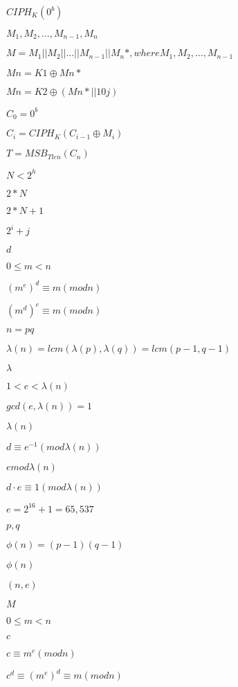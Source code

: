 \documentclass{article}
\begin{document}
${CIPH}_{K}({0}^{b})$
\pagebreak

${M}_{1}, {M}_{2}, ... , {M}_{n-1}, {M}_{n}$
\pagebreak

$M = {M}_{1} || {M}_{2} || ... || {M}_{n-1} || {M}_{n}*, where {M}_{1}, {M}_{2},...,{M}_{n-1}$
\pagebreak

$Mn = K1 \oplus Mn*$
\pagebreak

$Mn = K2 \oplus (Mn*||10j)$
\pagebreak

${C}_{0} = {0}^{b}$
\pagebreak

${C}_{i} = {CIPH}_{K}({C}_{i-1}\oplus{M}_{i})$
\pagebreak

$T = {MSB}_{Tlen}({C}_{n})$
\pagebreak

$ N < {2}^{h} $
\pagebreak

$ 2*N $
\pagebreak

$ 2*N + 1 $
\pagebreak

$ {2}^{i} + j $
\pagebreak

$ d$
\pagebreak

$ 0 \leq m < n$
\pagebreak

$ {({m}^{e})}^{d} \equiv m (mod n)$
\pagebreak

$ {({m}^{d})}^{e} \equiv m ( mod n )$
\pagebreak

$ n = pq$
\pagebreak

$ \lambda(n) = lcm(\lambda(p), \lambda(q)) = lcm(p−1, q−1)$
\pagebreak

$ \lambda$
\pagebreak

$ 1 < e < \lambda(n)$
\pagebreak

$ gcd(e, \lambda(n)) = 1$
\pagebreak

$ \lambda(n)$
\pagebreak

$ d \equiv {e}^{−1} (mod \lambda(n))$
\pagebreak

$ e mod \lambda(n)$
\pagebreak

$ d \cdot e \equiv 1 (mod \lambda(n))$
\pagebreak

$ e = {2}^{16} + 1 = 65,537$
\pagebreak

$ p, q$
\pagebreak

$ \phi(n) = (p − 1)(q − 1)$
\pagebreak

$ \phi(n)$
\pagebreak

$ (n, e)$
\pagebreak

$ M$
\pagebreak

$ 0 ≤ m < n$
\pagebreak

$ c$
\pagebreak

$ c \equiv {m}^{e} (mod n)$
\pagebreak

$ {c}^{d} \equiv {({m}^{e})}^{d} \equiv m (mod n)$
\pagebreak
\end{document}
